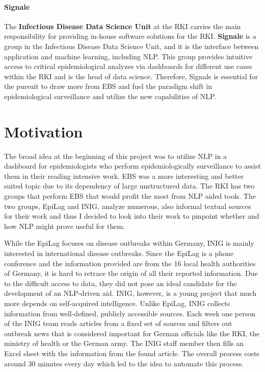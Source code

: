 \paragraph{Signale}
The \textbf{Infectious Disease Data Science Unit} at the RKI carries the main responsibility for providing in-house software solutions for the RKI.
\textbf{Signale} is a group in the Infectious Disease Data Science Unit, and it is the interface between application and machine learning, including NLP.
This group provides intuitive access to critical epidemiological analyzes via dashboards for different use cases within the RKI and is the head of data science.
Therefore, Signale is essential for the pursuit to draw more from EBS and fuel the paradigm shift in epidemiological surveillance and utilize the new capabilities of NLP.


\section{Motivation}
The broad idea at the beginning of this project was to utilize NLP in a dashboard for epidemiologists who perform epidemiologically
surveillance to assist them in their reading intensive work.
EBS was a more interesting and better suited topic due to its dependency of large unstructured data.
The RKI has two groups that perform EBS that would profit the most from NLP aided tools. The two groups, EpiLag and INIG, analyze numerous, also informal textual sources for their work and thus I decided to look into their work to pinpoint whether and how NLP might prove useful for them.

While the EpiLag focuses on disease outbreaks within Germany, INIG is mainly interested in international disease outbreaks. Since the EpiLag is a phone conference and the information provided are from the 16 local health authorities of Germany, it is hard to retrace the origin of all their reported information.
Due to the difficult access to data, they did not pose an ideal candidate for the development of an NLP-driven aid.
INIG, however, is a young project that much more depends on self-acquired intelligence.
Unlike EpiLag, INIG collects information from well-defined, publicly accessible sources.
Each week one person of the INIG team reads articles from a fixed set of sources and filters out outbreak news that is considered important for German officials like the RKI, the ministry of health or the German army.
The INIG staff member then fills an Excel sheet with the information from the found article.
The overall process costs around 30 minutes every day which led to the idea to automate this process.

